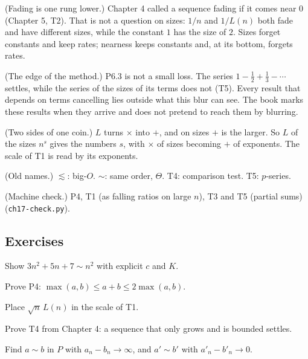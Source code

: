 \begin{lines}
\item[\lab{R1}] (Fading is one rung lower.) Chapter 4 called a sequence fading if it comes near $0$ (Chapter 5, T2). That is not a question on sizes: $1/n$ and $1/L(n)$ both fade and have different sizes, while the constant $1$ has the size of $2$. Sizes forget constants and keep rates; nearness keeps constants and, at its bottom, forgets rates.
\item[\lab{R2}] (The edge of the method.) P6.3 is not a small loss. The series $1 - \tfrac12 + \tfrac13 - \cdots$ settles, while the series of the sizes of its terms does not (T5). Every result that depends on terms cancelling lies outside what this blur can see. The book marks these results when they arrive and does not pretend to reach them by blurring.
\item[\lab{R3}] (Two sides of one coin.) $L$ turns $\times$ into $+$, and on sizes $+$ is the larger. So $L$ of the sizes $n^s$ gives the numbers $s$, with $\times$ of sizes becoming $+$ of exponents. The scale of T1 is read by its exponents.
\item[\lab{R4}] (Old names.) $\lesssim$: big-$O$. $\sim$: same order, $\Theta$. T4: comparison test. T5: $p$-series.
\item[\lab{R5}] (Machine check.) P4, T1 (as falling ratios on large $n$), T3 and T5 (partial sums) (\texttt{ch17-check.py}).
\end{lines}

\subsection*{Exercises}

\begin{lines}
\item[\lab{E1}] Show $3n^2 + 5n + 7 \sim n^2$ with explicit $c$ and $K$.
\item[\lab{E2}] Prove P4: $\max(a, b) \le a + b \le 2 \max(a, b)$.
\item[\lab{E3}] Place $\sqrt{n}\,L(n)$ in the scale of T1.
\item[\lab{E4}] Prove T4 from Chapter 4: a sequence that only grows and is bounded settles.
\item[\lab{E5}] Find $a \sim b$ in $P$ with $a_n - b_n \to \infty$, and $a' \sim b'$ with $a'_n - b'_n \to 0$.
\end{lines}

\newpage

